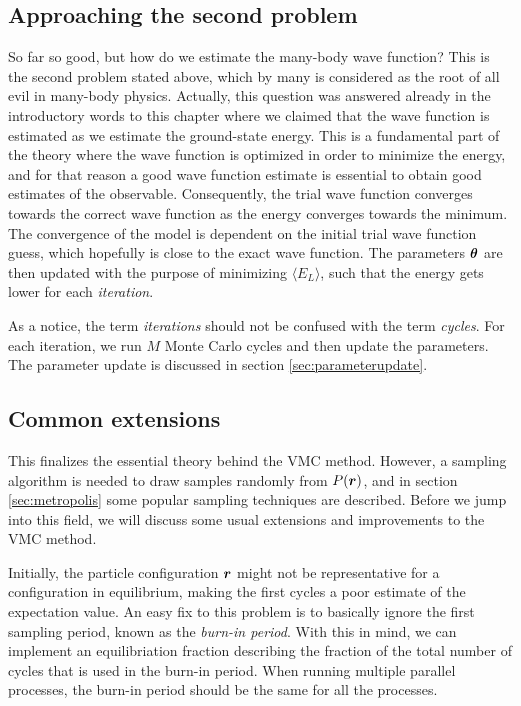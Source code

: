 \subsection{Approaching the second problem}
So far so good, but how do we estimate the many-body wave function? This is the second problem stated above, which by many is considered as the root of all evil in many-body physics. Actually, this question was answered already in the introductory words to this chapter where we claimed that the wave function is estimated as we estimate the ground-state energy. This is a fundamental part of the theory where the wave function is optimized in order to minimize the energy, and for that reason a good wave function estimate is essential to obtain good estimates of the observable. Consequently, the trial wave function converges towards the correct wave function as the energy converges towards the minimum. The convergence of the model is dependent on the initial trial wave function guess, which hopefully is close to the exact wave function. The parameters $\boldsymbol{{\theta}}$ are then updated with the purpose of minimizing $\langle E_L\rangle$, such that the energy gets lower for each \textit{iteration}.

As a notice, the term \textit{iterations} should not be confused with the term \textit{cycles}. For each iteration, we run $M$ Monte Carlo cycles and then update the parameters. The parameter update is discussed in section \ref{sec:parameterupdate}.

\subsection{Common extensions}
This finalizes the essential theory behind the VMC method. However, a sampling algorithm is needed to draw samples randomly from $P(\boldsymbol{{r}})$, and in section \ref{sec:metropolis} some popular sampling techniques are described. Before we jump into this field, we will discuss some usual extensions and improvements to the VMC method.

Initially, the particle configuration $\boldsymbol{{r}}$ might not be representative for a configuration in equilibrium, making the first cycles a poor estimate of the expectation value. An easy fix to this problem is to basically ignore the first sampling period, known as the \textit{burn-in period}. With this in mind, we can implement an equilibriation fraction describing the fraction of the total number of cycles that is used in the burn-in period. When running multiple parallel processes, the burn-in period should be the same for all the processes.

